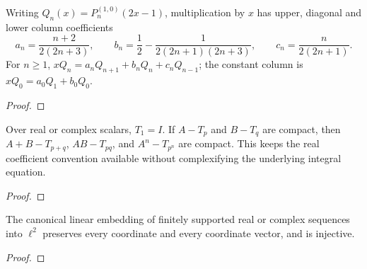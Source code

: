 \begin{supporting}
\begin{theorem}
\label{thm:shifted-jacobi-multiplication}
\leanok
Writing $Q_n(x)=P_n^{(1,0)}(2x-1)$, multiplication by $x$ has upper,
diagonal and lower column coefficients
\[
 a_n=\frac{n+2}{2(2n+3)},\qquad
 b_n=\frac12-\frac1{2(2n+1)(2n+3)},\qquad
 c_n=\frac n{2(2n+1)}.
\]
For $n\ge1$, $xQ_n=a_nQ_{n+1}+b_nQ_n+c_nQ_{n-1}$; the constant
column is $xQ_0=a_0Q_1+b_0Q_0$.
\end{theorem}
\begin{proof}
\leanok
\end{proof}


\begin{theorem}
\label{thm:toeplitz-laurent-algebra}
\leanok
Over real or complex scalars, $T_1=I$. If $A-T_p$ and $B-T_q$ are compact,
then $A+B-T_{p+q}$, $AB-T_{pq}$, and $A^n-T_{p^n}$ are compact.
This keeps the real coefficient convention available without complexifying
the underlying integral equation.
\end{theorem}
\begin{proof}
\leanok
\end{proof}


\begin{theorem}
\label{thm:finite-l2-embedding}
\leanok
The canonical linear embedding of finitely supported real or complex
sequences into $\ell^2$ preserves every coordinate and every coordinate vector,
and is injective.
\end{theorem}
\begin{proof}
\leanok
\end{proof}



\end{supporting}
